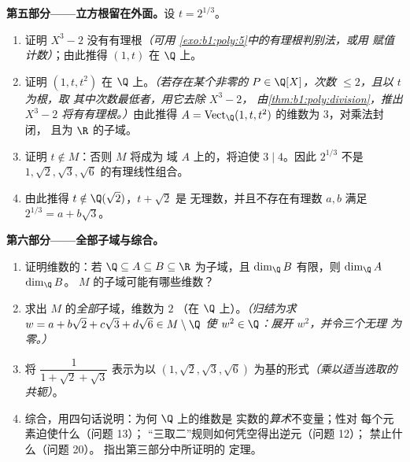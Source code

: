 \begin{problem}
\medskip
\noindent\textbf{第五部分——立方根留在外面。}设 $t
= 2^{1/3}$。
\begin{enumerate}[resume]
  \item 证明 $X^3 - 2$ 没有有理根\emph{（可用
        \cref{exo:b1:poly:5}中的有理根判别法，或用
        赋值计数）}；由此推得 $(1, t)$ 在
        $\Q$ 上。
  \item 证明 $(1, t, t^2)$ 在 $\Q$ 上。\emph{（若存在某个非零的
        $P \in \Q[X]$，次数 $\leq 2$，且以 $t$ 为根，取
        其中次数最低者，用它去除 $X^3 - 2$，
        由\cref{thm:b1:poly:division}，推出 $X^3 - 2$
        将有有理根。）}由此推得 $A =
        \operatorname{Vect}_\Q(1, t, t^2)$ 的维数为 $3$，对乘法封闭，
        且为 $\R$ 的子域。
  \item 证明 $t \notin M$：否则 $M$ 将成为
        域 $A$ 上的，将迫使
        $3 \mid 4$。因此 $2^{1/3}$ 不是
        $1, \sqrt2, \sqrt3, \sqrt6$ 的有理线性组合。
  \item 由此推得 $t \notin \Q(\sqrt2)$，$t + \sqrt2$ 是
        无理数，并且不存在有理数 $a, b$ 满足
        $2^{1/3} = a + b\sqrt3$。
\end{enumerate}

\medskip
\noindent\textbf{第六部分——全部子域与综合。}
\begin{enumerate}[resume]
  \item 证明维数的：若 $\Q \subseteq A
        \subseteq B \subseteq \R$ 为子域，且 $\dim_\Q B$
        有限，则 $\dim_\Q A$  $\dim_\Q B$。
        $M$ 的子域可能有哪些维数？
  \item 求出 $M$ 的\emph{全部}子域，维数为 $2$
        （在 $\Q$ 上）。\emph{（归结为求 $w = a + b\sqrt2
        + c\sqrt3 + d\sqrt6 \in M \setminus \Q$ 使 $w^2 \in
        \Q$：展开 $w^2$，并令三个无理
        为零。）}
  \item 将 $\dfrac1{1 + \sqrt2 + \sqrt3}$ 表示为以 $(1,
        \sqrt2, \sqrt3, \sqrt6)$ 为基的形式\emph{（乘以适当选取的
        共轭）}。
  \item 综合，用四句话说明：为何 $\Q$ 上的维数是
        实数的\emph{算术}不变量；性对
        每个元素迫使什么（问题 13）；
        “三取二”规则如何凭空得出逆元（问题 12）；
        禁止什么（问题 20）。
        指出第三部分中所证明的
        定理。
\end{enumerate}
\end{problem}
